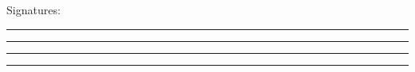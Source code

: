 \documentclass[11pt]{article}
\begin{document}
\vspace{18pt}
\noindent Signatures:\\[18pt]
\noindent\rule{0.2\textwidth}{0.4pt}\hfill\rule{0.2\textwidth}{0.4pt}\hfill\rule{0.2\textwidth}{0.4pt}\hfill\rule{0.2\textwidth}{0.4pt}\\
\noindent{}\hfill{}\hfill
{}\hfill{}
\end{document}
